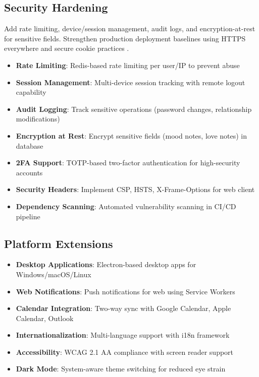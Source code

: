 \documentclass[sigconf, authorversion, nonacm, margin=0.75in]{acmart}
\begin{document}
\subsection{Security Hardening}
Add rate limiting, device/session management, audit logs, and encryption-at-rest for sensitive fields. Strengthen production deployment baselines using HTTPS everywhere and secure cookie practices \cite{owasp_authentication}.
\begin{itemize}
    \item \textbf{Rate Limiting}: Redis-based rate limiting per user/IP to prevent abuse
    \item \textbf{Session Management}: Multi-device session tracking with remote logout capability
    \item \textbf{Audit Logging}: Track sensitive operations (password changes, relationship modifications)
    \item \textbf{Encryption at Rest}: Encrypt sensitive fields (mood notes, love notes) in database
    \item \textbf{2FA Support}: TOTP-based two-factor authentication for high-security accounts
    \item \textbf{Security Headers}: Implement CSP, HSTS, X-Frame-Options for web client
    \item \textbf{Dependency Scanning}: Automated vulnerability scanning in CI/CD pipeline
\end{itemize}

\subsection{Platform Extensions}
\begin{itemize}
    \item \textbf{Desktop Applications}: Electron-based desktop apps for Windows/macOS/Linux
    \item \textbf{Web Notifications}: Push notifications for web using Service Workers
    \item \textbf{Calendar Integration}: Two-way sync with Google Calendar, Apple Calendar, Outlook
    \item \textbf{Internationalization}: Multi-language support with i18n framework
    \item \textbf{Accessibility}: WCAG 2.1 AA compliance with screen reader support
    \item \textbf{Dark Mode}: System-aware theme switching for reduced eye strain
\end{itemize}
\end{document}
